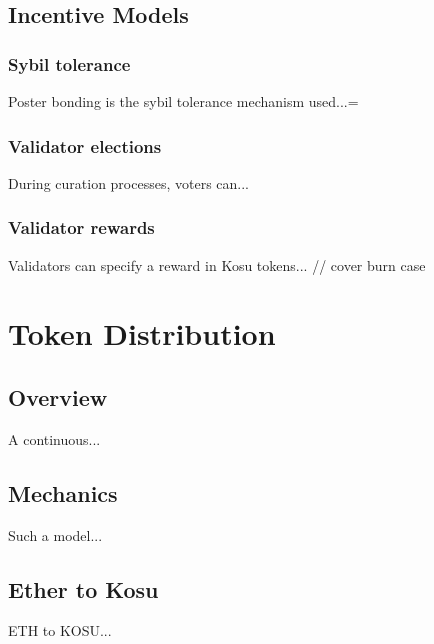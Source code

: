 \documentclass[10pt]{article}
\begin{document}
\subsection{Incentive Models}\label{incentive-models}

\subsubsection{Sybil tolerance}\label{incentive-models-sybil}
Poster bonding is the sybil tolerance mechanism used...=

\subsubsection{Validator elections}\label{incentive-models-val-elections}
During curation processes, voters can...

\subsubsection{Validator rewards}\label{incentive-models-val-rewards}
Validators can specify a reward in Kosu tokens... // cover burn case

\clearpage
\pagebreak


\section{Token Distribution}\label{token-distribution}

\subsection{Overview}\label{token-distribution-overview}
A continuous...

\subsection{Mechanics}\label{token-distribution-mechanics}
Such a model...

\subsection{Ether to Kosu}\label{token-distribution-eth-kosu}
ETH to KOSU...
\end{document}

